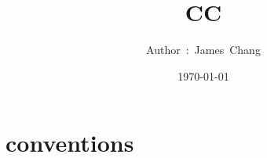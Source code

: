 

\title{CC}
\author{ {\Biohazard} \hspace{1.5mm} \hspace{1.5mm} Author\ :\ James\ Chang}
\date{\today}


\large

\tableofcontents

\chapter{conventions}






